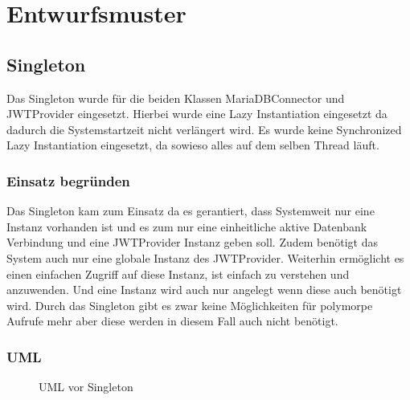 \chapter{Entwurfsmuster}

\section{Singleton}

Das Singleton wurde für die beiden Klassen MariaDBConnector und JWTProvider eingesetzt.
Hierbei wurde eine Lazy Instantiation eingesetzt da dadurch die Systemstartzeit nicht verlängert wird.
Es wurde keine Synchronized Lazy Instantiation eingesetzt, da sowieso alles auf dem selben Thread läuft.

\subsection{Einsatz begründen}

Das Singleton kam zum Einsatz da es gerantiert,
dass Systemweit nur eine Instanz vorhanden ist und es zum nur eine einheitliche aktive Datenbank Verbindung und eine JWTProvider Instanz geben soll.
Zudem benötigt das System auch nur eine globale Instanz des JWTProvider.
Weiterhin ermöglicht es einen einfachen Zugriff auf diese Instanz, ist einfach zu verstehen und anzuwenden.
Und eine Instanz wird auch nur angelegt wenn diese auch benötigt wird.
Durch das Singleton gibt es zwar keine Möglichkeiten für polymorpe Aufrufe mehr aber diese werden in diesem Fall auch nicht benötigt.

\newpage
\subsection{UML}


\begin{figure}[htbp]
    \centering
    \caption{\label{1} UML vor Singleton}
\end{figure}

